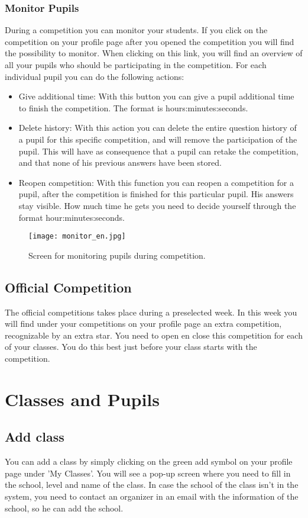 \documentclass[11pt,a4paper]{report}
\begin{document}
\subsubsection{Monitor Pupils}
During a competition you can monitor your students. If you click on the competition on your profile page after you opened the competition you will find the possibility to monitor. When clicking on this link, you will find an overview of all your pupils who should be participating in the competition. For each individual pupil you can do the following actions:
\begin{itemize}
	\item Give additional time: With this button you can give a pupil additional time to finish the competition. The format is hours:minutes:seconds.
	\item Delete history: With this action you can delete the entire question history of a pupil for this specific competition, and will remove the participation of the pupil. This will have as consequence that a pupil can retake the competition, and that none of his previous answers have been stored.
	\item Reopen competition: With this function you can reopen a competition for a pupil, after the competition is finished for this particular pupil.  His answers stay visible. How much time he gets you need to decide yourself through the format hour:minutes:seconds.
\end{itemize}

\begin{figure}[h!]
\centering
\texttt{[image: monitor\_en.jpg]}
\caption{Screen for monitoring pupils during competition.}
\label{fig:monitor}
\end{figure}


\subsection{Official Competition}
The official competitions takes place during a preselected week. In this week you will find under your competitions on your profile page an extra competition, recognizable by an extra star. You need to open en close this competition for each of your classes. You do this best just before your class starts with the competition.

\section{Classes and Pupils}
\subsection{Add class}
You can add a class by simply clicking on the green add symbol on your profile page under 'My Classes'. You will see a pop-up screen where you need to fill in the school, level and name of the class. In case the school of the class isn't in the system, you need to contact an organizer in an email with the information of the school, so he can add the school.
\end{document}
